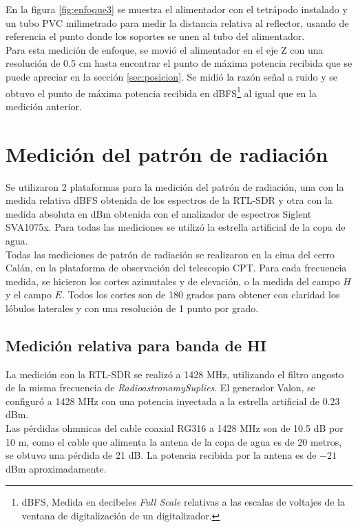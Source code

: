 En la figura \ref{fig:enfoque3} se muestra el alimentador con el tetrápodo instalado y un tubo PVC milimetrado para medir la distancia relativa al reflector, usando de referencia el punto donde los soportes se unen al tubo del alimentador.\\

Para esta medición de enfoque, se movió el alimentador en el eje Z con una resolución de 0.5 cm hasta encontrar el punto de máxima potencia recibida que se puede apreciar en la sección \ref{sec:posicion}. Se midió la razón señal a ruido y se obtuvo el punto de máxima potencia recibida en dBFS\footnote{dBFS, Medida en decibeles \textit{Full Scale} relativas a las escalas de voltajes de la ventana de digitalización de un digitalizador.} al igual que en la medición anterior.\\

\section{Medición del patrón de radiación}

Se utilizaron 2 plataformas para la medición del patrón de radiación, una con la medida relativa dBFS obtenida de los espectros de la RTL-SDR y otra con la medida absoluta en dBm obtenida con el analizador de espectros Siglent SVA1075x. Para todas las mediciones se utilizó la estrella artificial de la copa de agua.\\

Todas las mediciones de patrón de radiación se realizaron en la cima del cerro Calán, en la plataforma de observación del telescopio CPT. Para cada frecuencia medida, se hicieron los cortes azimutales y de elevación, o la medida del campo $H$ y el campo $E$. Todos los cortes son de 180 grados para obtener con claridad los lóbulos laterales y con una resolución de 1 punto por grado.\\


\subsection{Medición relativa para banda de HI}

La medición con la RTL-SDR se realizó a 1428 MHz, utilizando el filtro angosto de la misma frecuencia de \textit{RadioastronomySuplies}. El generador Valon, se configuró a 1428 MHz con una potencia inyectada a la estrella artificial de 0.23 dBm.\\

Las pérdidas ohmnicas del cable coaxial RG316 a 1428 MHz son de 10.5 dB por 10 m, como el cable que alimenta la antena de la copa de agua es de 20 metros, se obtuvo una pérdida de 21 dB. La potencia recibida por la antena es de $-21$ dBm aproximadamente.\\

